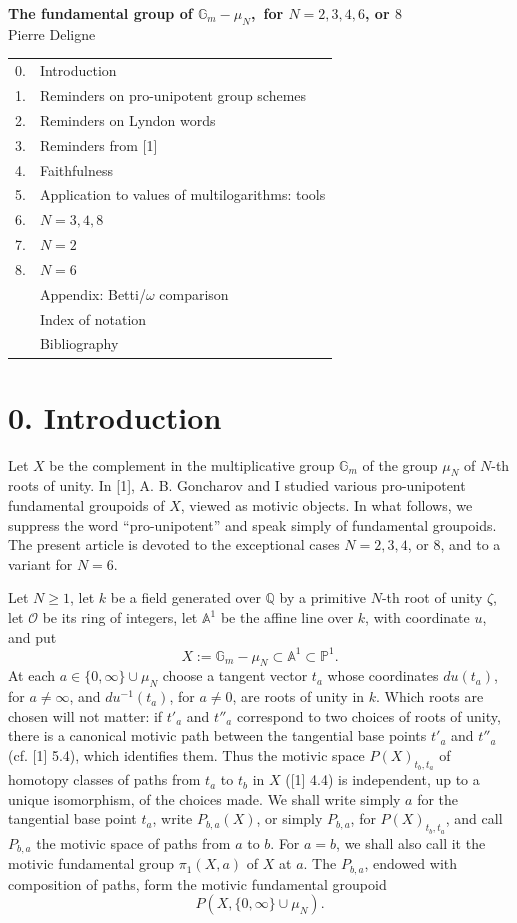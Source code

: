 \documentclass[10pt,a4paper]{article}
\newcommand{\Gm}{\mathbb G_m}
\newcommand{\Q}{\mathbb Q}
\newcommand{\A}{\mathbb A}
\newcommand{\Pone}{\mathbb P^1}
\newcommand{\OO}{\mathcal O}
\theoremstyle{deligne}
\begin{document}
\begin{center}
{\Large\bfseries The fundamental group of \(\Gm-\mu_N\),\ for \(N=2,3,4,6\), or \(8\)}\\[0.4em]
{\large Pierre Deligne}
\end{center}

\begin{center}
\begin{tabular}{rl}
0. & Introduction\\
1. & Reminders on pro-unipotent group schemes\\
2. & Reminders on Lyndon words\\
3. & Reminders from [1]\\
4. & Faithfulness\\
5. & Application to values of multilogarithms: tools\\
6. & \(N=3,4,8\)\\
7. & \(N=2\)\\
8. & \(N=6\)\\
& Appendix: Betti/\(\omega\) comparison\\
& Index of notation\\
& Bibliography
\end{tabular}
\end{center}

\section*{0. Introduction}

Let \(X\) be the complement in the multiplicative group \(\Gm\) of the group \(\mu_N\) of \(N\)-th roots of unity. In [1], A. B. Goncharov and I studied various pro-unipotent fundamental groupoids of \(X\), viewed as motivic objects. In what follows, we suppress the word ``pro-unipotent'' and speak simply of fundamental groupoids. The present article is devoted to the exceptional cases \(N=2,3,4\), or \(8\), and to a variant for \(N=6\).

Let \(N\ge1\), let \(k\) be a field generated over \(\Q\) by a primitive \(N\)-th root of unity \(\zeta\), let \(\OO\) be its ring of integers, let \(\A^1\) be the affine line over \(k\), with coordinate \(u\), and put
\[
X:=\Gm-\mu_N\subset \A^1\subset \Pone .
\]
At each \(a\in\{0,\infty\}\cup\mu_N\) choose a tangent vector \(t_a\) whose coordinates \(du(t_a)\), for \(a\ne\infty\), and \(d u^{-1}(t_a)\), for \(a\ne0\), are roots of unity in \(k\). Which roots are chosen will not matter: if \(t'_a\) and \(t''_a\) correspond to two choices of roots of unity, there is a canonical motivic path between the tangential base points \(t'_a\) and \(t''_a\) (cf. [1] 5.4), which identifies them. Thus the motivic space \(P(X)_{t_b,t_a}\) of homotopy classes of paths from \(t_a\) to \(t_b\) in \(X\) ([1] 4.4) is independent, up to a unique isomorphism, of the choices made. We shall write simply \(a\) for the tangential base point \(t_a\), write \(P_{b,a}(X)\), or simply \(P_{b,a}\), for \(P(X)_{t_b,t_a}\), and call \(P_{b,a}\) the motivic space of paths from \(a\) to \(b\). For \(a=b\), we shall also call it the motivic fundamental group \(\pi_1(X,a)\) of \(X\) at \(a\). The \(P_{b,a}\), endowed with composition of paths, form the motivic fundamental groupoid
\[
P(X,\{0,\infty\}\cup\mu_N).
\]
\end{document}
